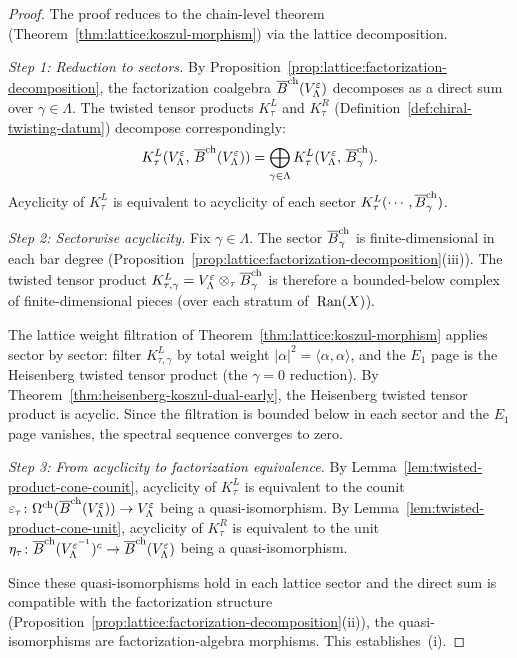 \begin{proof}
The proof reduces to the chain-level theorem
(Theorem~\ref{thm:lattice:koszul-morphism}) via the lattice
decomposition.

\emph{Step 1: Reduction to sectors.}
By Proposition~\ref{prop:lattice:factorization-decomposition}, the
factorization coalgebra
$\overline{B}^{\mathrm{ch}}(V_\Lambda^\varepsilon)$ decomposes as a
direct sum over $\gamma \in \Lambda$.  The twisted tensor products
$K_\tau^L$ and $K_\tau^R$
(Definition~\ref{def:chiral-twisting-datum}) decompose
correspondingly:
\[
K_\tau^L(V_\Lambda^\varepsilon,\,
\overline{B}^{\mathrm{ch}}(V_\Lambda^\varepsilon))
= \bigoplus_{\gamma \in \Lambda}
K_\tau^L(V_\Lambda^\varepsilon,\,
\overline{B}^{\mathrm{ch}}_\gamma).
\]
Acyclicity of $K_\tau^L$ is equivalent to acyclicity of each
sector $K_\tau^L(\cdots, \overline{B}^{\mathrm{ch}}_\gamma)$.

\emph{Step 2: Sectorwise acyclicity.}
Fix $\gamma \in \Lambda$.  The sector
$\overline{B}^{\mathrm{ch}}_\gamma$ is finite-dimensional in each bar
degree (Proposition~\ref{prop:lattice:factorization-decomposition}(iii)).
The twisted tensor product
$K_{\tau,\gamma}^L = V_\Lambda^\varepsilon
\otimes_\tau \overline{B}^{\mathrm{ch}}_\gamma$ is therefore a
bounded-below complex of finite-dimensional pieces (over each
stratum of~$\operatorname{Ran}(X)$).

The lattice weight filtration of
Theorem~\ref{thm:lattice:koszul-morphism} applies sector by
sector: filter $K_{\tau,\gamma}^L$ by total weight
$|\alpha|^2 = \langle\alpha,\alpha\rangle$, and the
$E_1$ page is the Heisenberg twisted tensor product
(the $\gamma = 0$ reduction).  By
Theorem~\ref{thm:heisenberg-koszul-dual-early}, the Heisenberg
twisted tensor product is acyclic.  Since the filtration is
bounded below in each sector and the $E_1$ page vanishes, the
spectral sequence converges to zero.

\emph{Step 3: From acyclicity to factorization equivalence.}
By Lemma~\ref{lem:twisted-product-cone-counit}, acyclicity of
$K_\tau^L$ is equivalent to the counit
$\varepsilon_\tau\colon
\Omega^{\mathrm{ch}}(\overline{B}^{\mathrm{ch}}(V_\Lambda^\varepsilon))
\to V_\Lambda^\varepsilon$
being a quasi-isomorphism.  By
Lemma~\ref{lem:twisted-product-cone-unit}, acyclicity of
$K_\tau^R$ is equivalent to the unit
$\eta_\tau\colon
\overline{B}^{\mathrm{ch}}(V_\Lambda^{\varepsilon^{-1}})^c
\to \overline{B}^{\mathrm{ch}}(V_\Lambda^\varepsilon)$
being a quasi-isomorphism.

Since these quasi-isomorphisms hold in each lattice sector and the
direct sum is compatible with the factorization structure
(Proposition~\ref{prop:lattice:factorization-decomposition}(ii)),
the quasi-isomorphisms are factorization-algebra morphisms.  This
establishes~(i).


\end{proof}
